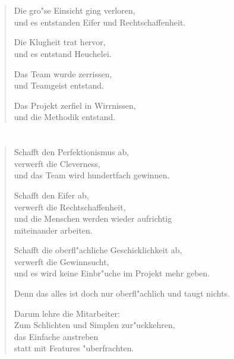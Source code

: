 \documentclass[a4paper,10pt,openany]{book}
\begin{document}
\chapter{}
\begin{verse}
    Die gro"se Einsicht ging verloren,\\
    und es entstanden Eifer und Rechtschaffenheit.

    Die Klugheit trat hervor,\\
    und es entstand Heuchelei.

    Das Team wurde zerrissen,\\
    und Teamgeist entstand.

    Das Projekt zerfiel in Wirrnissen,\\
    und die Methodik entstand.
\end{verse}

\chapter{}
\begin{verse}
    Schafft den Perfektionismus ab,\\
    verwerft die Cleverness,\\
    und das Team wird hundertfach gewinnen.

    Schafft den Eifer ab,\\
    verwerft die Rechtschaffenheit,\\
    und die Menschen werden wieder aufrichtig\\
    miteinander arbeiten.

    Schafft die oberfl"achliche Geschicklichkeit ab,\\
    verwerft die Gewinnsucht,\\
    und es wird keine Einbr"uche im Projekt mehr geben.

    Denn das alles ist doch nur oberfl"achlich und taugt nichts.

    Darum lehre die Mitarbeiter:\\
    Zum Schlichten und Simplen zur"uckkehren,\\
    das Einfache anstreben\\
    statt mit Features "uberfrachten.
\end{verse}

\end{document}
